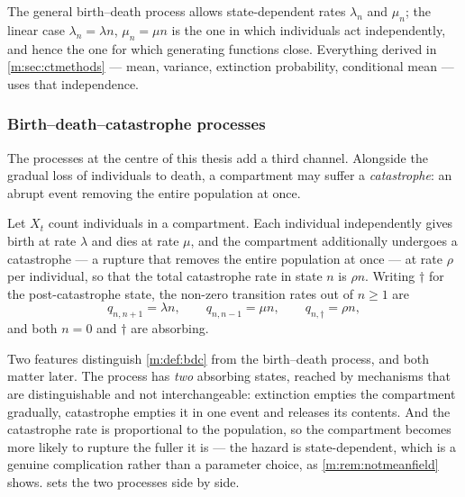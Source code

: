 The general birth--death process allows state-dependent rates $\lambda_n$ and
$\mu_n$; the linear case $\lambda_n=\lambda n$, $\mu_n=\mu n$ is the one in which
individuals act independently, and hence the one for which generating functions
close. Everything derived in \cref{m:sec:ctmethods} --- mean, variance, extinction
probability, conditional mean --- uses that independence.

\subsubsection{Birth--death--catastrophe processes}
\label{m:sec:bdc}

The processes at the centre of this thesis add a third channel. Alongside the
gradual loss of individuals to death, a compartment may suffer a
\emph{catastrophe}: an abrupt event removing the entire population at once.

\begin{definition}
\label{m:def:bdc}
Let $X_t$ count individuals in a compartment. Each individual independently gives
birth at rate $\lambda$ and dies at rate $\mu$, and the compartment additionally
undergoes a catastrophe --- a rupture that removes the entire population at once
--- at rate $\rho$ per individual, so that the total catastrophe rate in state $n$
is $\rho n$. Writing $\dagger$ for the post-catastrophe state, the non-zero
transition rates out of $n\ge1$ are
\begin{equation}
\label{m:eq:bdcrates}
q_{n,n+1} = \lambda n,
\qquad
q_{n,n-1} = \mu n,
\qquad
q_{n,\dagger} = \rho n ,
\end{equation}
and both $n=0$ and $\dagger$ are absorbing.
\end{definition}

Two features distinguish \cref{m:def:bdc} from the birth--death process, and both
matter later. The process has \emph{two} absorbing states, reached by mechanisms
that are distinguishable and not interchangeable: extinction empties the
compartment gradually, catastrophe empties it in one event and releases its
contents. And the catastrophe rate is proportional to the population, so the
compartment becomes more likely to rupture the fuller it is --- the hazard is
state-dependent, which is a genuine complication rather than a parameter choice, as
\cref{m:rem:notmeanfield} shows.  sets the two processes
side by side.

